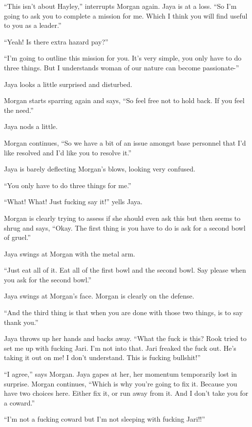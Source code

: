 ``This isn't about Hayley,'' interrupts Morgan again.  Jaya is at a loss.  ``So I'm going to ask you to complete a mission for me. Which I think you will find useful to you as a leader.''

``Yeah!  Is there extra hazard pay?''

``I'm going to outline this mission for you.  It's very simple, you only have to do three things.  But I understands woman of our nature can become passionate-''  

Jaya looks a little surprised and disturbed.

Morgan starts sparring again and says, ``So feel free not to hold back.  If you feel the need.''  

Jaya nods a little.

Morgan continues, ``So we have a bit of an issue amongst base personnel that I'd like resolved and I'd like you to resolve it.''

Jaya is barely deflecting Morgan's blows, looking very confused.

``You only have to do three things for me.''

``What!  What!  Just fucking say it!'' yells Jaya.

Morgan is clearly trying to assess if she should even ask this but then seems to shrug and says, ``Okay. The first thing is you have to do is ask for a second bowl of gruel.''

Jaya swings at Morgan with the metal arm. 

``Just eat all of it. Eat all of the first bowl and the second bowl.  Say please when you ask for the second bowl.''

Jaya swings at Morgan's face.  Morgan is clearly on the defense.

``And the third thing is that when you are done with those two things, is to say thank you.''

Jaya throws up her hands and backs away. ``What the fuck is this?  Rook tried to set me up with fucking Jari.  I'm not into that.  Jari freaked the fuck out.  He's taking it out on me!  I don't understand.  This is fucking bullshit!''

``I agree,'' says Morgan.  Jaya gapes at her, her momentum temporarily lost in surprise.  Morgan continues, ``Which is why you're going to fix it.  Because you have two choices here.  Either fix it, or run away from it.  And I don't take you for a coward.''

``I'm not a fucking coward but I'm not sleeping with fucking Jari!!''

